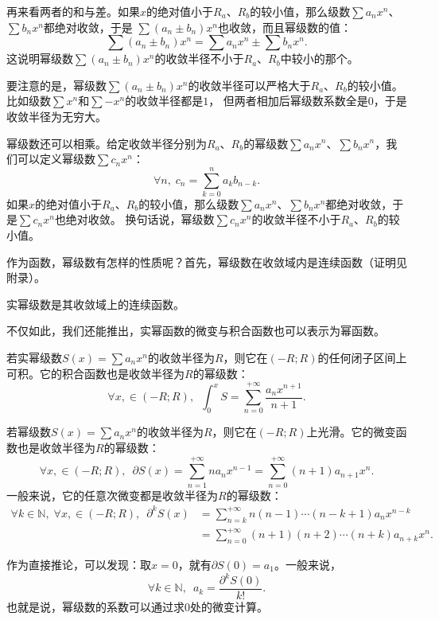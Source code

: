 \documentclass[12pt,UTF8]{ctexbook}
\begin{document}
再来看两者的和与差。如果$x$的绝对值小于$R_a$、$R_b$的较小值，那么级数$\sum a_n x^n$、$\sum b_n x^n$都绝对收敛，于是
$\sum (a_n \pm b_n) x^n$也收敛，而且幂级数的值：
$$\sum (a_n \pm b_n) x^n = \sum a_n x^n \pm \sum b_n x^n.$$
这说明幂级数$\sum (a_n \pm b_n) x^n$的收敛半径不小于$R_a$、$R_b$中较小的那个。

要注意的是，幂级数$\sum (a_n \pm b_n) x^n$的收敛半径可以严格大于$R_a$、$R_b$的较小值。比如级数$\sum x^n$和$\sum -x^n$的收敛半径都是$1$，
但两者相加后幂级数系数全是$0$，于是收敛半径为无穷大。

幂级数还可以相乘。给定收敛半径分别为$R_a$、$R_b$的幂级数$\sum a_n x^n$、$\sum b_n x^n$，我们可以定义幂级数$\sum c_n x^n$：
$$ \forall n, \; c_n = \sum_{k=0}^n a_k b_{n-k}.$$
如果$x$的绝对值小于$R_a$、$R_b$的较小值，那么级数$\sum a_n x^n$、$\sum b_n x^n$都绝对收敛，于是$\sum c_n x^n$也绝对收敛。
换句话说，幂级数$\sum c_n x^n$的收敛半径不小于$R_a$、$R_b$的较小值。

作为函数，幂级数有怎样的性质呢？首先，幂级数在收敛域内是连续函数（证明见附录）。

\begin{tm}
    实幂级数是其收敛域上的连续函数。
\end{tm}

不仅如此，我们还能推出，实幂函数的微变与积合函数也可以表示为幂函数。

\begin{tm}
    若实幂级数$S(x) = \sum a_n x^n$的收敛半径为$R$，则它在$(-R;R)$的任何闭子区间上可积。它的积合函数也是收敛半径为$R$的幂级数：
    $$ \forall x, \in (-R;R),\,\,\, \int_0^x S =  \sum_{n=0}^{+\infty} \frac{a_n x^{n+1}}{n + 1}. $$
\end{tm}

\begin{tm}
    若幂级数$S(x) = \sum a_n x^n$的收敛半径为$R$，则它在$(-R;R)$上光滑。它的微变函数也是收敛半径为$R$的幂级数：
    $$ \forall x, \in (-R;R),\,\,\, \partial S(x) =  \sum_{n=1}^{+\infty} na_n x^{n-1} = \sum_{n=0}^{+\infty} (n + 1)a_{n+1} x^{n}. $$
    一般来说，它的任意次微变都是收敛半径为$R$的幂级数：
    \begin{align*}
        \forall k \in \mathbb{N},\;\forall x, \in (-R;R),\,\,\, \partial^k S(x) &= \sum_{n=k}^{+\infty} n(n-1)\cdots(n - k + 1)a_n x^{n-k} \\
        &= \sum_{n=0}^{+\infty} (n + 1)(n + 2)\cdots(n + k)a_{n+k} x^{n}. 
    \end{align*}
\end{tm}

作为直接推论，可以发现：取$x=0$，就有$\partial S(0) = a_1$。一般来说，
$$\forall k\in \mathbb{N}, \,\,\, a_k = \frac{\partial^k S(0)}{k!}.$$
也就是说，幂级数的系数可以通过求$0$处的微变计算。
\end{document}
